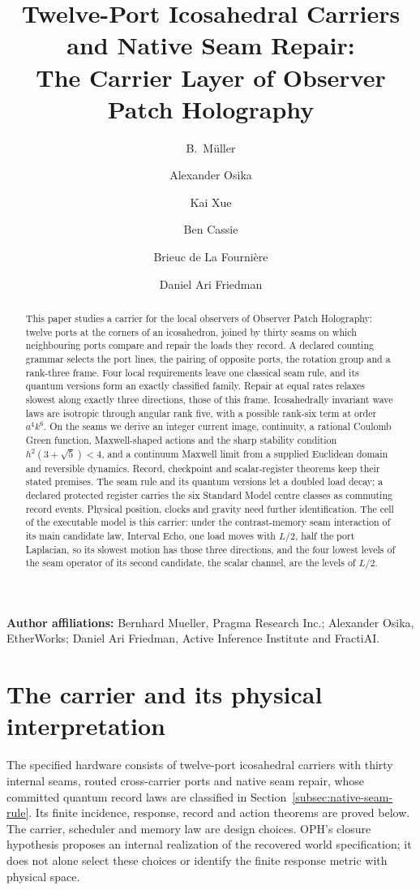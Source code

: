 \documentclass[11pt]{article}
\title{Twelve-Port Icosahedral Carriers and Native Seam Repair:\\
The Carrier Layer of Observer Patch Holography}
\author{B.\ M\"uller \and Alexander Osika \and Kai Xue \and Ben Cassie
\and Brieuc de La Fourni\`ere \and Daniel Ari Friedman}
\date{\OPHPaperReleaseDate}
\theoremstyle{remark}
\theoremstyle{plain}
\begin{document}
\maketitle
\OPHPaperReleaseBanner

\begin{center}
\small\textbf{Author affiliations:} Bernhard Mueller, Pragma Research Inc.; Alexander Osika, EtherWorks; Daniel Ari Friedman, Active Inference Institute and FractiAI.
\end{center}

\begin{abstract}
This paper studies a carrier for the local observers of Observer Patch
Holography: twelve ports at the corners of an icosahedron, joined by thirty
seams on which neighbouring ports compare and repair the loads they record. A
declared counting grammar selects the port lines, the pairing of opposite
ports, the rotation group and a rank-three frame. Four local requirements
leave one classical seam rule, and its quantum versions form an exactly
classified family. Repair at equal rates relaxes slowest along exactly three
directions, those of this frame. Icosahedrally invariant wave laws are
isotropic through angular rank five, with a possible rank-six term at order
$a^4k^6$. On the seams we derive an integer current image, continuity, a
rational Coulomb Green function, Maxwell-shaped actions and the sharp
stability condition $h^2(3+\sqrt5)<4$, and a continuum Maxwell limit from a
supplied Euclidean domain and reversible dynamics. Record, checkpoint and
scalar-register theorems keep their stated premises. The seam rule and its
quantum versions let a doubled load decay; a declared protected register
carries the six Standard Model centre classes as commuting record events.
Physical position, clocks and gravity need further identification. The cell
of the executable model is this carrier: under the contrast-memory seam
interaction of its main candidate law, Interval Echo, one load moves with
$L/2$, half the port Laplacian, so its slowest motion has those three
directions, and the four lowest levels of the seam operator of its second
candidate, the scalar channel, are the levels of $L/2$.
\end{abstract}


\section*{The carrier and its physical interpretation}
\label{sec:hypothesis-tower}

The specified hardware consists of twelve-port icosahedral carriers with
thirty internal seams, routed cross-carrier ports and native seam repair,
whose committed quantum record laws are classified in
Section~\ref{subsec:native-seam-rule}.
Its finite incidence, response, record and action theorems are proved below.
The carrier, scheduler and memory law are design choices. OPH's closure
hypothesis proposes an internal realization of the recovered world
specification; it does not alone select these choices or identify the
finite response metric with physical space.
\end{document}
